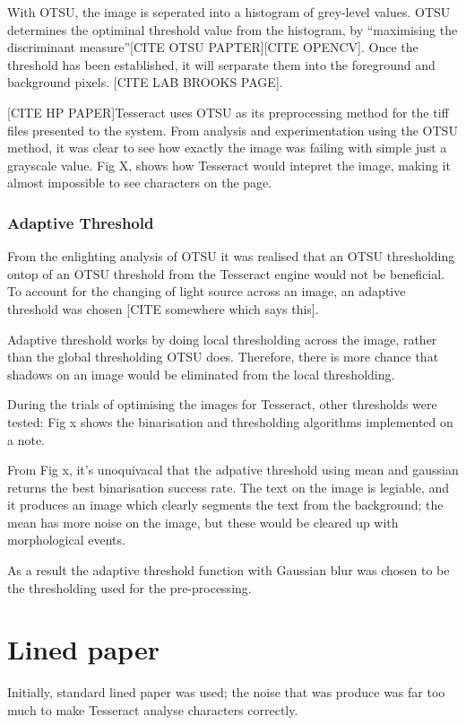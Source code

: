 With OTSU, the image is seperated into a histogram of grey-level values. OTSU determines the optiminal threshold value from the histogram, by ``maximising the discriminant measure''[CITE OTSU PAPTER][CITE OPENCV]. %
Once the threshold has been established, it will serparate them into the foreground and background pixels. [CITE LAB BROOKS PAGE].

[CITE HP PAPER]Tesseract uses OTSU as its preprocessing method for the tiff files presented to the system. From analysis and experimentation using the OTSU method, it was clear to see how exactly the image was failing with simple just a grayscale value. Fig X, shows how Tesseract would intepret the image, making it almost impossible to see characters on the page.

\subsubsection{Adaptive Threshold}
From the enlighting analysis of OTSU it was realised that an OTSU thresholding ontop of an OTSU threshold from the Tesseract engine would not be beneficial. To account for the changing of light source across an image, an adaptive threshold was chosen [CITE somewhere which says this].

Adaptive threshold works by doing local thresholding across the image, rather than the global thresholding OTSU does. Therefore, there is more chance that shadows on an image would be eliminated from the local thresholding.

During the trials of optimising the images for Tesseract, other thresholds were tested: Fig x shows the binarisation and thresholding algorithms implemented on a note.

From Fig x, it's unoquivacal that the adpative threshold using mean and gaussian returns the best binarisation success rate. The text on the image is legiable, and it produces an image which clearly segments the text from the background; the mean has more noise on the image, but these would be cleared up with morphological events.

As a result the adaptive threshold function with Gaussian blur was chosen to be the thresholding used for the pre-processing.

\section{Lined paper}
Initially, standard lined paper was used; the noise that was produce was far too much to make Tesseract analyse characters correctly.

